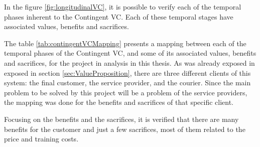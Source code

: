 \par
In the figure \ref{fig:longitudinalVC}, it is possible to verify each of the temporal phases inherent to the Contingent \gls{VC}. Each of these temporal stages have associated values, benefits and sacrifices. 
\par
The table \ref{tab:contingentVCMapping} presents a mapping between each of the temporal phases of the Contingent \gls{VC}, and some of its associated values, benefits and sacrifices, for the project in analysis in this thesis. As was already exposed in exposed in section \ref{sec:ValueProposition}, there are three different clients of this system: the final customer, the service provider, and the courier. Since the main problem to be solved by this project will be a problem of the service providers, the mapping was done for the benefits and sacrifices of that specific client. 
\par
Focusing on the benefits and the sacrifices, it is verified that there are many benefits for the customer and just a few sacrifices, most of them related to the price and training costs.
\par
